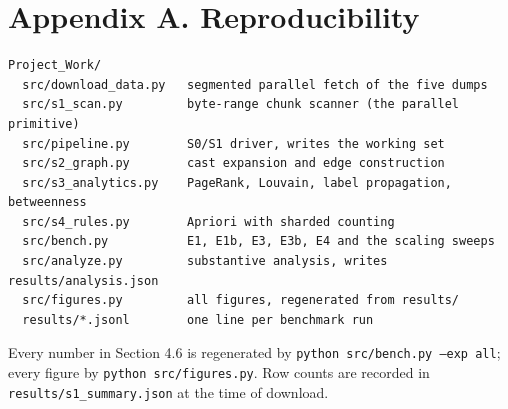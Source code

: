 
\section{Appendix A. Reproducibility}

\begin{verbatim}
Project_Work/
  src/download_data.py   segmented parallel fetch of the five dumps
  src/s1_scan.py         byte-range chunk scanner (the parallel primitive)
  src/pipeline.py        S0/S1 driver, writes the working set
  src/s2_graph.py        cast expansion and edge construction
  src/s3_analytics.py    PageRank, Louvain, label propagation, betweenness
  src/s4_rules.py        Apriori with sharded counting
  src/bench.py           E1, E1b, E3, E3b, E4 and the scaling sweeps
  src/analyze.py         substantive analysis, writes results/analysis.json
  src/figures.py         all figures, regenerated from results/
  results/*.jsonl        one line per benchmark run
\end{verbatim}

Every number in Section 4.6 is regenerated by \texttt{python src/bench.py --exp all}; every figure by \texttt{python src/figures.py}. Row counts are recorded in \texttt{results/s1\_summary.json} at the time of download.

